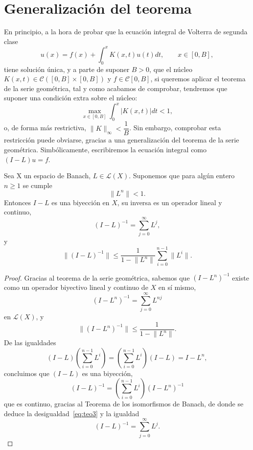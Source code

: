 \section{Generalización del teorema}
En principio, a la hora de probar que la ecuación integral de Volterra de segunda clase
\begin{equation}
	u(x) = f(x) + \int_{0}^{x} K(x,t)u(t)dt, \qquad x \in [0,B],
\end{equation}
tiene solución única, y a parte de suponer $B > 0$, que el núcleo $K(x,t) \in \mathcal{C}([0,B]\times[0,B])$ y $f \in \mathcal{C}[0,B]$, si queremos aplicar el teorema de la serie geométrica, tal y como acabamos de comprobar, tendremos que suponer una condición extra sobre el núcleo:
\begin{equation}
	\max_{x\in [0,B]}\int_{0}^{x} |K(x,t)|dt < 1,
\end{equation}
o, de forma más restrictiva, $\lVert K \rVert_{\infty} < \dfrac{1}{B}$. Sin embargo, comprobar esta restricción puede obviarse, gracias a una generalización del teorema de la serie geométrica. Simbólicamente, escribiremos la ecuación integral como $(I-L)u = f$.
\begin{corolario}\label{corolario}
	Sea X un espacio de Banach, $L \in \mathcal{L}(X)$. Suponemos que para algún entero $n \geqslant 1$ se cumple
	\begin{equation}
		\lVert L^n \rVert < 1.
	\end{equation}
	Entonces $I - L$ es una biyección en $X$, su inversa es un operador lineal y continuo,
	\begin{equation}
		(I-L)^{-1}=\sum_{j=0}^{\infty}L^j, 
	\end{equation}
	y
	\begin{equation}\label{eq:teo3}
		\lVert (I-L)^{-1} \rVert \leqslant \dfrac{1}{1 - \lVert L^n \rVert} \sum_{i=0}^{n - 1}\lVert L^i \rVert.
	\end{equation}
\end{corolario}
\begin{proof}
	Gracias al teorema de la serie geométrica, sabemos que $(I-L^n)^{-1}$ existe como un operador biyectivo lineal y continuo de $X$ en sí mismo,
	\begin{equation}
		(I - L^n)^{-1} = \sum_{j=0}^{\infty}L^{nj} 
	\end{equation}
	en $\mathcal{L}(X)$, y
	\begin{equation}
		\lVert (I - L^n)^{-1} \rVert \leqslant \dfrac{1}{1 - \lVert L^n \rVert}.
	\end{equation}
	De las igualdades
	\begin{equation}
		(I - L)(\sum_{i=0}^{n - 1}L^i) = (\sum_{i=0}^{n - 1}L^i)(I-L) = I - L^n,
	\end{equation}
	concluimos que $(I-L)$ es una biyección,
	\begin{equation}
		(I-L)^{-1} = (\sum_{i=0}^{n-1}L^i)(I-L^n)^{-1}
	\end{equation}
	que es continuo, gracias al Teorema de los isomorfismos de Banach, de donde se deduce la desigualdad~\eqref{eq:teo3} y la igualdad
	\begin{equation}
		(I-L)^{-1}=\sum_{j=0}^{\infty}L^j.
	\end{equation}
\end{proof}
